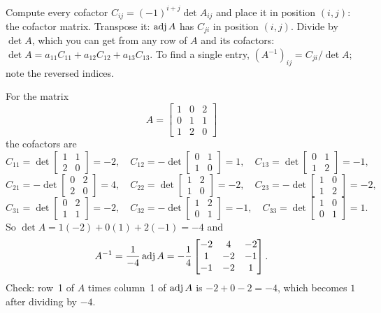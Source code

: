 \documentclass[10pt]{scrartcl}
\begin{document}
\begin{steps}
  \ii Compute every cofactor $C_{ij}=(-1)^{i+j}\det A_{ij}$ and place it in position $(i,j)$: the cofactor matrix.
  \ii Transpose it: $\operatorname{adj} A$ has $C_{ji}$ in position $(i,j)$.
  \ii Divide by $\det A$, which you can get from any row of $A$ and its cofactors: $\det A=a_{11}C_{11}+a_{12}C_{12}+a_{13}C_{13}$.
  \ii To find a single entry, $(A^{-1})_{ij}=C_{ji}/\det A$; note the reversed indices.
\end{steps}

\begin{example*}
For the matrix
\[
  A=\begin{bmatrix}1&0&2\\0&1&1\\1&2&0\end{bmatrix}
\]
the cofactors are
\[
  C_{11}=\det\begin{bmatrix}1&1\\2&0\end{bmatrix}=-2,\quad C_{12}=-\det\begin{bmatrix}0&1\\1&0\end{bmatrix}=1,\quad C_{13}=\det\begin{bmatrix}0&1\\1&2\end{bmatrix}=-1,
\]
\[
  C_{21}=-\det\begin{bmatrix}0&2\\2&0\end{bmatrix}=4,\quad C_{22}=\det\begin{bmatrix}1&2\\1&0\end{bmatrix}=-2,\quad C_{23}=-\det\begin{bmatrix}1&0\\1&2\end{bmatrix}=-2,
\]
\[
  C_{31}=\det\begin{bmatrix}0&2\\1&1\end{bmatrix}=-2,\quad C_{32}=-\det\begin{bmatrix}1&2\\0&1\end{bmatrix}=-1,\quad C_{33}=\det\begin{bmatrix}1&0\\0&1\end{bmatrix}=1.
\]
So $\det A=1(-2)+0(1)+2(-1)=-4$ and
\[
  A^{-1}=\frac{1}{-4}\operatorname{adj} A=-\frac14\begin{bmatrix}-2&4&-2\\1&-2&-1\\-1&-2&1\end{bmatrix}.
\]
Check: row~1 of $A$ times column~1 of $\operatorname{adj} A$ is $-2+0-2=-4$, which becomes $1$ after dividing by $-4$.
\end{example*}
\end{document}
